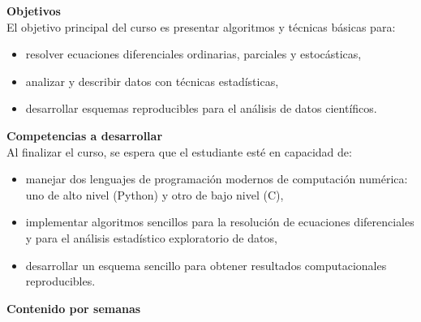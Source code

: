 \documentclass[letterpaper,10pt,onecolumn]{article}
\begin{document}
\noindent\textbf{\large {} \quad Objetivos}\\[-0.2cm]

\noindent\normalsize El objetivo principal del curso es presentar
algoritmos y t\'ecnicas b\'asicas para:

\begin{itemize}
\item resolver ecuaciones
  diferenciales ordinarias, parciales y estoc\'asticas, \\[-0.6cm]
\item analizar y describir datos con t\'ecnicas estad\'isticas, \\[-0.6cm]
\item desarrollar esquemas reproducibles para el an\'alisis de datos cient\'ificos. \\[-0.6cm]
\end{itemize}

\noindent\textbf{\large {} \quad Competencias a
  desarrollar}\\[-0.2cm] 


\noindent\normalsize Al finalizar el curso, se espera que el
estudiante est\'e en capacidad de: 

\begin{itemize}
\item manejar dos lenguajes de programaci\'on modernos de
  computaci\'on num\'erica: uno de alto
  nivel (Python) y otro de bajo nivel (C),\\[-0.6cm] 
\item implementar algoritmos sencillos para la resoluci\'on de
  ecuaciones diferenciales y para el an\'alisis estad\'istico
  exploratorio de datos, \\[-0.6cm]   
\item desarrollar un esquema sencillo para obtener resultados
  computacionales reproducibles.\\[-0.6cm]  
\end{itemize}

\noindent\textbf{\large {} \quad Contenido por
  semanas}\\[-0.2cm]  

\end{document}
